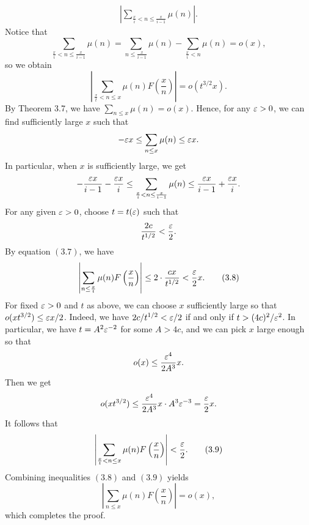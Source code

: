 \begin{pf}
\begin{align*}
        \left| \sum_{\frac xi < n \leq \frac{x}{i-1}} \mu(n) \right|. 
    \end{align*}
    Notice that 
    \[ \sum_{\frac xi < n \leq \frac{x}{i-1}} \mu(n) = 
    \sum_{n \leq \frac{x}{i-1}} \mu(n) - \sum_{\frac{x}{i} < n} \mu(n) = o(x), \] 
    so we obtain 
    \[ \left| \sum_{\frac xt < n \leq x} \mu(n) F\left( \frac xn \right) \right| 
    = o(t^{3/2}x). \] 
    By Theorem 3.7, we have $\sum_{n\leq x} \mu(n) = o(x)$. Hence, 
    for any $\varepsilon > 0$, we can find sufficiently large $x$ such that 
    \[ -\varepsilon x \leq \sum_{n\leq x} \mu(n) \leq \varepsilon x. \] 
    In particular, when $x$ is sufficiently large, we get 
    \[ -\frac{\varepsilon x}{i-1} - \frac{\varepsilon x}{i} 
    \leq \sum_{\frac{x}{i} < n \leq \frac{x}{i-1}} \mu(n) 
    \leq \frac{\varepsilon x}{i-1} + \frac{\varepsilon x}{i}. \] 
    For any given $\varepsilon > 0$, choose $t = t(\varepsilon)$ such that 
    \[ \frac{2c}{t^{1/2}} < \frac{\varepsilon}2. \] 
    By equation $(3.7)$, we have 
    \[ \left| \sum_{n\leq \frac{x}{t}} \mu(n) F\left( \frac xn \right) \right| 
    \leq 2 \cdot \frac{cx}{t^{1/2}} < \frac{\varepsilon}2 x. \tag{3.8} \] 
    For fixed $\varepsilon > 0$ and $t$ as above, we can choose $x$ sufficiently large 
    so that $o(xt^{3/2}) \leq \varepsilon x/2$. Indeed, we have 
    $2c/t^{1/2} < \varepsilon/2$ if and only if $t > (4c)^2/\varepsilon^2$. In particular, 
    we have $t = A^2\varepsilon^{-2}$ for some $A > 4c$, and we can pick $x$ large 
    enough so that 
    \[ o(x) \leq \frac{\varepsilon^4}{2A^3}x. \] 
    Then we get 
    \[ o(xt^{3/2}) \leq \frac{\varepsilon^4}{2A^3} x \cdot A^3\varepsilon^{-3} = \frac{\varepsilon}2 x. \] 
    It follows that 
    \[ \left| \sum_{\frac xt < n \leq x} \mu(n) F\left( \frac xn \right) \right| < 
    \frac{\varepsilon}2. \tag{3.9} \] 
    Combining inequalities $(3.8)$ and $(3.9)$ yields 
    \[ \left| \sum_{n\leq x} \mu(n) F\left( \frac xn \right) \right| = o(x), \] 
    which completes the proof. 
\end{pf}

